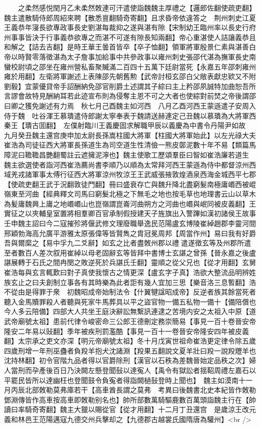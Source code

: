 　　之柔然感悦閏月乙未柔然敇連可汗遣使詣魏魏主厚禮之【邏郎佐翻使疏吏翻】　魏主遣散騎侍郎周紹來聘【散悉亶翻騎奇寄翻】且求昏帝依違答之　荆州刺史江夏王義恭年寖長欲專政事長史劉湛每裁抑之遂與湛有隙【宋制幼王臨州率以長史行府州事事皆決于行事義恭欲專之而湛不可遂有隙長知兩翻】帝心重湛使人詰讓義恭且和解之【詰去吉翻】是時王華王曇首皆卒【卒子恤翻】領軍將軍殷景仁素與湛善白帝以時賢零落徵湛為太子詹事加給事中共參政事以雍州刺史張邵代湛為撫軍長史南蠻校尉頃之邵坐在雍州營私畜聚贓滿二百四十五萬下廷尉當死【永嘉五年邵刺雍州雍於用翻】左衛將軍謝述上表陳邵先朝舊勲【武帝討桓玄邵白父敞表獻忠欵又不附劉毅】宜蒙優貸帝手詔酬納免邵官削爵土述謂其子綜曰主上矜邵夙誠特加曲恕吾所言謬會故特見酬納耳若此迹宣布則為侵奪主恩不可之大者也使綜對前焚之帝後謂邵曰卿之獲免謝述有力焉　秋七月己酉魏主如河西　八月乙酉河西王蒙遜遣子安周入侍于魏　吐谷渾王慕璝遣侍郎謝太寧奉表于魏請送赫連定己丑魏以慕璝為大將軍西秦王【璝古囬翻】　左僕射臨川王義慶固求解職甲辰以義慶為中書令丹陽尹如故　九月癸丑魏主還宫庚申加太尉長孫嵩柱國大將軍【柱國大將軍始此】以左光祿大夫崔浩為司徒征西大將軍長孫道生為司空道生性清儉一熊皮鄣泥數十年不易【類篇馬障泥曰韂韂昌艷翻蜀註云遮擁泥濘也】魏主使歌工歷頌羣臣曰智如崔浩廉若道生　魏主欲選使者詣河西崔浩薦尚書李順乃以順為太常拜河西王蒙遜為侍中都督涼州西域羌戎諸軍事太傅行征西大將軍涼州牧涼王王武威張掖敦煌酒泉西海金城西平七郡【使疏吏翻王武于況翻敦徒門翻】冊曰盛衰存亡與魏升降北盡窮髮南極庸㟭西被崐嶺東至河曲【經典釋文司馬曰窮髮北極之下無毛之地也按毛草也地理書云山以草木為髪庸魏興上庸之地㟭㟭山也崑嶺謂崑崙河曲朔方之河曲也㟭與岷同被皮義翻】王實征之以夾輔皇室置將相羣卿百官承制假授建天子旌旗出入警蹕如漢初諸侯王故事　壬申魏主詔曰今二寇摧殄將偃武修文理廢職舉逸民范陽盧玄博陵崔綽趙郡李靈河間邢穎勃海高允廣平游雅太原張偉等皆賢雋之胄冠冕周邦【周當作州】易曰我有好爵吾與爾縻之【易中孚九二爻辭】如玄之比者盡敇州郡以禮遣遂徵玄等及州郡所遣至者數百人差次叙用崔綽以母老固辭玄等皆拜中書博士玄諶之曾孫【晉永嘉之後盧諶展轉于石氏之間冉閔之敗逆死於兵諶氏壬翻】靈順之從父兄也【從才用翻】玄舅崔浩每與玄言輒歎曰對子真使我懷古之情更深【盧玄字子真】浩欲大整流品明辨姓族玄止之曰夫創制立事各有其時樂為此者詎有幾人宜加三思【樂音洛三息暫翻】浩不從由是得罪于衆　初魏昭成帝始制法令【什翼犍諡昭成帝】反逆者族其餘當死者聽入金馬贖罪殺人者聽與死家牛馬葬具以平之盜官物一備五私物一備十【備陪償也今人多云陪備】四部大人共坐王庭決辭訟無繫訊連逮之苦境内安之太祖入中原【道武帝廟號太祖】患前代律令峻密命三公郎王德刪定務崇簡易【事見一百十卷晉安帝隆安二年易以䜴翻】季年被疾刑罰濫酷【事見一百十一卷晉安帝隆安四年被皮義翻】太宗承之吏文亦深【明元帝廟號太祖】冬十月戊寅世祖命崔浩更定律令除五歲四歲刑增一年刑巫蠱者負羖羊抱犬沈諸淵【羖果五翻說文夏羊壯曰羖一說羖䍽羊也沈持林翻】初令官階九品者得以官爵除刑【漢官以石秩為差魏晉始定品秩之次】婦人當刑而孕產後百日乃決闕左懸登聞鼔以達寃人【禹令有獄訟者揺鞀周禮左嘉石以平罷民皆所以達幽枉也登聞鼓令負寃者得詣闕檛鼔登時上聞也】　魏主如漠南十一月丙辰北部敇勒莫弗庫若干【高車酋長謂之莫弗　考異曰後魏書北史本紀皆作敇勒鄧淵傳皆作高車按高車即敇勒别名也】帥所部數萬騎驅鹿數百萬頭詣魏主行在【帥讀曰率騎奇寄翻】魏主大獵以賜從官【從才用翻】十二月丁丑還宫　是歲涼王改元義和林邑王范陽邁寇九德交州兵擊却之【九德郡古越裳氏國隋唐為驩州】<br />
